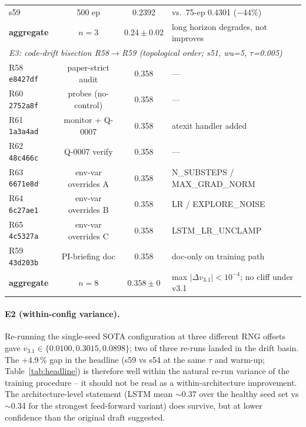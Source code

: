 \documentclass[journal,onecolumn,11pt]{IEEEtran}
\begin{document}
\begin{table}[!t]
\begin{tabular}{lccl}
    s59 & 500 ep       & 0.2392 & vs.\ 75-ep 0.4301 (\textbf{$-44\%$}) \\
    \textbf{aggregate} & $n=3$       & \textbf{$0.24 \pm 0.02$} & long horizon degrades, not improves \\
    \midrule
    \multicolumn{4}{l}{\emph{E3: code-drift bisection R58$\rightarrow$R59
      (topological order; s51, wu=5, $\tau$=0.005)}} \\
    R58 \texttt{e8427df} & paper-strict audit & 0.358 & --- \\
    R60 \texttt{2752a8f} & probes (no-control) & 0.358 & --- \\
    R61 \texttt{1a3a4ad} & monitor + Q-0007 & 0.358 & atexit handler added \\
    R62 \texttt{48c466c} & Q-0007 verify & 0.358 & --- \\
    R63 \texttt{6671e8d} & env-var overrides A & 0.358 & N\_SUBSTEPS / MAX\_GRAD\_NORM \\
    R64 \texttt{6c27ae1} & env-var overrides B & 0.358 & LR / EXPLORE\_NOISE \\
    R65 \texttt{4c5327a} & env-var overrides C & 0.358 & LSTM\_LR\_UNCLAMP \\
    R59 \texttt{43d203b} & PI-briefing doc & 0.358 & doc-only on training path \\
    \textbf{aggregate} & $n=8$ & \textbf{$0.358 \pm 0$} & max $|\Delta v_{3.1}| < 10^{-4}$; no cliff under v3.1 \\
    \bottomrule
  \end{tabular}
\end{table}

\paragraph{E2 (within-config variance).} Re-running the
single-seed SOTA configuration at three different RNG offsets gave
$v_{3.1} \in \{0.0100, 0.3015, 0.0898\}$; two of three re-runs
landed in the drift basin. The +4.9\,\% gap in the headline
(s59 vs s54 at the same $\tau$ and warm-up; Table~\ref{tab:headline})
is therefore well within the natural re-run variance of the
training procedure -- it should not be read as a within-architecture
improvement. The architecture-level statement (LSTM mean
$\sim$0.37 over the healthy seed set vs $\sim$0.34 for the strongest
feed-forward variant) does survive, but at lower confidence than
the original draft suggested.
\end{document}
